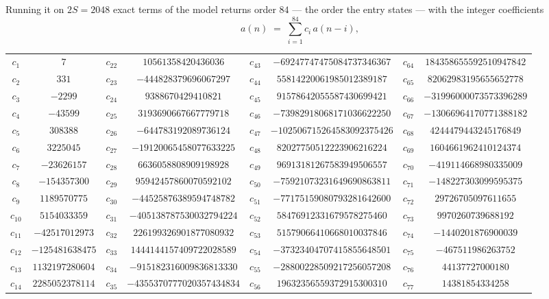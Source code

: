 \documentclass[11pt,a4paper]{article}
\theoremstyle{plain}
\theoremstyle{definition}
\begin{document}
Running it on $2S=2048$ exact terms of the model returns order $84$ --- the order the
entry states --- with the integer coefficients
\[
a(n)\;=\;\sum_{i=1}^{84}c_i\,a(n-i),
\]
\begin{center}\small
\begin{tabular}{cccccccc}
$c_{1}$ & $7$ & $c_{22}$ & $10561358420436036$ & $c_{43}$ & $-69247747475084737346367$ & $c_{64}$ & $184358655592510947842$ \\
$c_{2}$ & $331$ & $c_{23}$ & $-444828379696067297$ & $c_{44}$ & $55814220061985012389187$ & $c_{65}$ & $82062983195655652778$ \\
$c_{3}$ & $-2299$ & $c_{24}$ & $9388670429410821$ & $c_{45}$ & $91578642055587430699421$ & $c_{66}$ & $-31996000073573396289$ \\
$c_{4}$ & $-43599$ & $c_{25}$ & $3193690667667779718$ & $c_{46}$ & $-73982918068171036622250$ & $c_{67}$ & $-13066964170771388182$ \\
$c_{5}$ & $308388$ & $c_{26}$ & $-644783192089736124$ & $c_{47}$ & $-102506715264583092375426$ & $c_{68}$ & $4244479443245176849$ \\
$c_{6}$ & $3225045$ & $c_{27}$ & $-19120065458077633225$ & $c_{48}$ & $82027750512223906216224$ & $c_{69}$ & $1604661962410124374$ \\
$c_{7}$ & $-23626157$ & $c_{28}$ & $6636058808909198928$ & $c_{49}$ & $96913181267583949506557$ & $c_{70}$ & $-419114668980335009$ \\
$c_{8}$ & $-154357300$ & $c_{29}$ & $95942457860070592102$ & $c_{50}$ & $-75921073231649690863811$ & $c_{71}$ & $-148227303099595375$ \\
$c_{9}$ & $1189570775$ & $c_{30}$ & $-44525876389594748782$ & $c_{51}$ & $-77175159080793281642600$ & $c_{72}$ & $29726705097611655$ \\
$c_{10}$ & $5154033359$ & $c_{31}$ & $-405138787530032794224$ & $c_{52}$ & $58476912331679578275460$ & $c_{73}$ & $9970260739688192$ \\
$c_{11}$ & $-42517012973$ & $c_{32}$ & $226199326901877080932$ & $c_{53}$ & $51579066410668010037846$ & $c_{74}$ & $-1440201876900039$ \\
$c_{12}$ & $-125481638475$ & $c_{33}$ & $1444144157409722028589$ & $c_{54}$ & $-37323404707415855648501$ & $c_{75}$ & $-467511986263752$ \\
$c_{13}$ & $1132197280604$ & $c_{34}$ & $-915182316009836813330$ & $c_{55}$ & $-28800228509217256057208$ & $c_{76}$ & $44137727000180$ \\
$c_{14}$ & $2285052378114$ & $c_{35}$ & $-4355370777020357434834$ & $c_{56}$ & $19632356559372915300310$ & $c_{77}$ & $14381854334258$ \\

\end{tabular}
\end{center}
\end{document}
